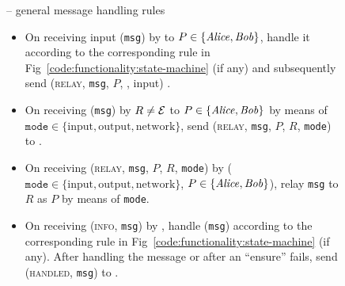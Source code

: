 
\begin{figure}[H]
  \begin{systembox}{\fchan{} -- general message handling rules}
    \begin{itemize}
      \item On receiving input (\texttt{msg}) by \environment to $P \in
      \{\mathit{Alice}, \mathit{Bob}\}$, handle it according to the corresponding rule in
      Fig~\ref{code:functionality:state-machine} (if any) and subsequently send
      (\textsc{relay}, \texttt{msg}, $P$, \environment, input) \adversary.
      \item On receiving (\texttt{msg}) by $R \neq \mathcal{E}$ to $P \in
      \{\mathit{Alice}, \mathit{Bob}\}$ by means of $\texttt{mode} \in \{\mathrm{input},
      \mathrm{output}, \mathrm{network}\}$, send (\textsc{relay}, \texttt{msg},
      $P$, $R$, \texttt{mode}) to \adversary.  
      \item On receiving (\textsc{relay}, \texttt{msg}, $P$, $R$, \texttt{mode})
      by \adversary ($\texttt{mode} \in \{\mathrm{input}, \mathrm{output},
      \mathrm{network}\}$, $P \in \{\mathit{Alice}, \mathit{Bob}\}$), relay \texttt{msg} to $R$
      as $P$ by means of \texttt{mode}. 
      \item On receiving (\textsc{info}, \texttt{msg}) by \adversary, handle
      (\texttt{msg}) according to the corresponding rule in
      Fig~\ref{code:functionality:state-machine} (if any). After handling the
      message or after an ``ensure'' fails, send (\textsc{handled},
      \texttt{msg}) to \adversary. 
    \end{itemize}
  \end{systembox}
  \caption{}
  \label{code:functionality:rules}
\end{figure}

